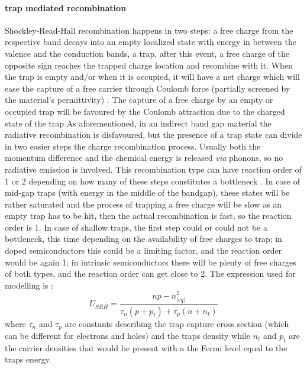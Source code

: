 		\paragraph{ trap mediated recombination}
		Shockley-Read-Hall recombination \cite{Shockley1952} happens in two steps: a free charge from the respective band decays into an empty localized state with energy in between the valence and the conduction bands, a trap, after this event, a free charge of the opposite sign reaches the trapped charge location and recombine with it.
		When the trap is empty and/or when it is occupied, it will have a net charge which will ease the capture of a free carrier through Coulomb force (partially screened by the material's permittivity) \cite{Kirchartz2018,Kirchartz2019}.
		The capture of a free charge by an empty or occupied trap will be favoured by the Coulomb attraction due to the charged state of the trap
		As aforementioned, in an indirect band gap material the radiative recombination is disfavoured, but the presence of a trap state can divide in two easier steps the charge recombination process.
		Usually both the momentum difference and the chemical energy is released \textsl{via} phonons, so no radiative emission is involved.
		This recombination type can have reaction order of 1 or 2 depending on how many of these steps constitutes a bottleneck \cite{Calado2019}.
		In case of mid-gap traps (with energy in the middle of the bandgap), these states will be rather saturated and the process of trapping a free charge will be slow as an empty trap has to be hit, then the actual recombination is fast, so the reaction order is 1.
		In case of shallow traps, the first step could or could not be a bottleneck, this time depending on the availability of free charges to trap: in doped semiconductors this could be a limiting factor, and the reaction order would be again 1; in intrinsic semiconductors there will be plenty of free charges of both types, and the reaction order can get close to 2.
		The expression used for modelling is \cite{Shockley1952,Nelson2003}:
		\begin{equation}\label{eq:srh}
			U_{SRH} = \frac{np-n_|eq|^2}{\tau_n(p+p_t)+ \tau_p(n+n_t)}
		\end{equation}
		where $\tau_n$ and $\tau_p$ are constants describing the trap capture cross section (which can be different for electrons and holes) and the traps density while $n_t$ and $p_t$ are the carrier densities that would be present with a the Fermi level equal to the traps energy.
